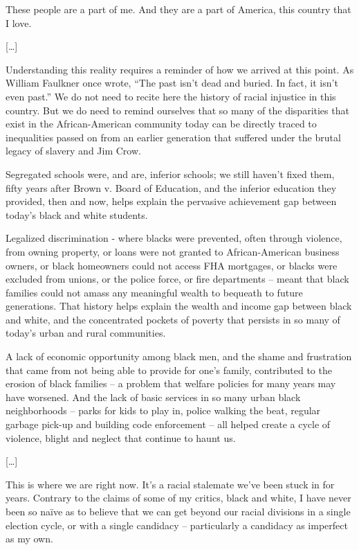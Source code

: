 \documentclass[10pt,a4paper]{article}
\begin{document}
These people are a part of me. And they are a part of America, this country that I love.

[…]

Understanding this reality requires a reminder of how we arrived at this point. As William Faulkner once wrote, “The past isn’t dead and buried. In fact, it isn’t even past.” We do not need to recite here the history of racial injustice in this country. But we do need to remind ourselves that so many of the disparities that exist in the African-American community today can be directly traced to inequalities passed on from an earlier generation that suffered under the brutal legacy of slavery and Jim Crow.

Segregated schools were, and are, inferior schools; we still haven’t fixed them, fifty years after Brown v. Board of Education, and the inferior education they provided, then and now, helps explain the pervasive achievement gap between today’s black and white students.

Legalized discrimination - where blacks were prevented, often through violence, from owning property, or loans were not granted to African-American business owners, or black homeowners could not access FHA mortgages, or blacks were excluded from unions, or the police force, or fire departments – meant that black families could not amass any meaningful wealth to bequeath to future generations. That history helps explain the wealth and income gap between black and white, and the concentrated pockets of poverty that persists in so many of today’s urban and rural communities.

A lack of economic opportunity among black men, and the shame and frustration that came from not being able to provide for one’s family, contributed to the erosion of black families – a problem that welfare policies for many years may have worsened. And the lack of basic services in so many urban black neighborhoods – parks for kids to play in, police walking the beat, regular garbage pick-up and building code enforcement – all helped create a cycle of violence, blight and neglect that continue to haunt us. 

[…]

This is where we are right now. It’s a racial stalemate we’ve been stuck in for years. Contrary to the claims of some of my critics, black and white, I have never been so naïve as to believe that we can get beyond our racial divisions in a single election cycle, or with a single candidacy – particularly a candidacy as imperfect as my own.
\end{document}
